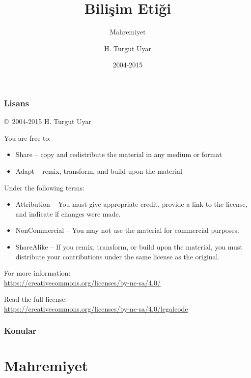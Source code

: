 \documentclass[dvipsnames]{beamer}
\title{Bilişim Etiği}
\subtitle{Mahremiyet}
\author{H. Turgut Uyar}
\date{2004-2015}
\theoremstyle{definition}
\theoremstyle{example}
\theoremstyle{plain}
\begin{document}
\begin{frame}
  \titlepage
\end{frame}

\begin{frame}
  \frametitle{Lisans}

  \hfill
  \copyright~2004-2015 H. Turgut Uyar

  \vfill
  \begin{footnotesize}
    You are free to:
    \begin{itemize}
      \itemsep0em
      \item Share -- copy and redistribute the material in any medium or format
      \item Adapt -- remix, transform, and build upon the material
    \end{itemize}

    Under the following terms:
    \begin{itemize}
      \itemsep0em
      \item Attribution -- You must give appropriate credit, provide a link to
        the license, and indicate if changes were made.

      \item NonCommercial -- You may not use the material for commercial
        purposes.

      \item ShareAlike -- If you remix, transform, or build upon the material,
        you must distribute your contributions under the same license as the
        original.
    \end{itemize}
  \end{footnotesize}

  \begin{small}
    For more information:\\
    \url{https://creativecommons.org/licenses/by-nc-sa/4.0/}

    \smallskip
    Read the full license:\\
    \url{https://creativecommons.org/licenses/by-nc-sa/4.0/legalcode}
  \end{small}
\end{frame}

\begin{frame}
  \frametitle{Konular}
  \tableofcontents
\end{frame}

\section{Mahremiyet}
\end{document}

